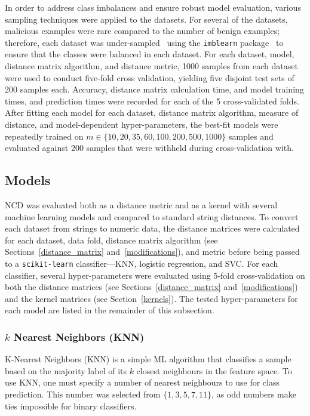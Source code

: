 \documentclass[preprint,12pt]{article}
\begin{document}
In order to address class imbalances and ensure robust model evaluation, various sampling techniques were applied to the datasets. 
For several of the datasets, malicious examples were rare compared to the number of benign examples; therefore, each dataset was under-sampled~\cite{undersampling} using the \texttt{imblearn} package~\cite{imblearn} to ensure that the classes were balanced in each dataset. 
For each dataset, model, distance matrix algorithm, and distance metric, 1000 samples from each dataset were used to conduct five-fold cross validation, yielding five disjoint test sets of 200 samples each. 
Accuracy, distance matrix calculation time, and model training times, and prediction times were recorded for each of the 5 cross-validated folds.
After fitting each model for each dataset, distance matrix algorithm, measure of distance, and model-dependent hyper-parameters, the best-fit models were repeatedly trained on $m \in \{ 10, 20, 35, 60, 100, 200, 500, 1000\}$ samples and evaluated against 200 samples that were withheld during cross-validation with.



\subsection{Models}
\label{models}
NCD was evaluated both as a distance metric and as a kernel with several machine learning models and compared to standard string distances.
To convert each dataset from strings to numeric data, the distance matrices were calculated for each dataset, data fold, distance matrix algorithm (see Sections~\ref{distance_matrix} and~\ref{modifications}), and metric before being passed to a \texttt{scikit-learn} classifier---KNN, logistic regression, and SVC.
For each classifier, several hyper-parameters were evaluated using 5-fold cross-validation on both the distance matrices (see Sections~\ref{distance_matrix} and~\ref{modifications}) and the kernel matrices (see Section~\ref{kernels}).
The tested hyper-parameters for each model are listed in the remainder of this subsection.


\subsubsection{$k$ Nearest Neighbors (KNN)}
K-Nearest Neighbors (KNN) is a simple ML algorithm that classifies a sample based on the majority label of its $k$ closest neighbours in the feature space.
To use KNN, one must specify a number of nearest neighbours to use for class prediction. 
This number was selected from $\{1,3,5,7,11\}$, as odd numbers make ties impossible for binary classifiers.
\end{document}
